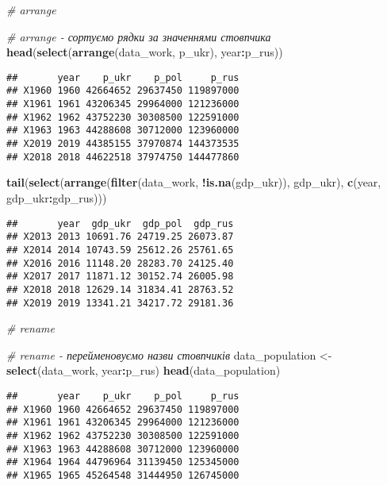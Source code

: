 \documentclass[
]{article}
\newenvironment{Shaded}{\begin{snugshade}}{\end{snugshade}}
\newcommand{\CommentTok}[1]{\textcolor[rgb]{0.56,0.35,0.01}{\textit{#1}}}
\newcommand{\KeywordTok}[1]{\textcolor[rgb]{0.13,0.29,0.53}{\textbf{#1}}}
\newcommand{\NormalTok}[1]{#1}
\newcommand{\OperatorTok}[1]{\textcolor[rgb]{0.81,0.36,0.00}{\textbf{#1}}}
\newcommand{\StringTok}[1]{\textcolor[rgb]{0.31,0.60,0.02}{#1}}
\begin{document}
\begin{Shaded}
\begin{Highlighting}[]
\CommentTok{# arrange}

\CommentTok{# arrange - сортуємо рядки за значеннями стовпчика}
\KeywordTok{head}\NormalTok{(}\KeywordTok{select}\NormalTok{(}\KeywordTok{arrange}\NormalTok{(data_work, p_ukr), year}\OperatorTok{:}\NormalTok{p_rus))}
\end{Highlighting}
\end{Shaded}

\begin{verbatim}
##       year    p_ukr    p_pol     p_rus
## X1960 1960 42664652 29637450 119897000
## X1961 1961 43206345 29964000 121236000
## X1962 1962 43752230 30308500 122591000
## X1963 1963 44288608 30712000 123960000
## X2019 2019 44385155 37970874 144373535
## X2018 2018 44622518 37974750 144477860
\end{verbatim}

\begin{Shaded}
\begin{Highlighting}[]
\KeywordTok{tail}\NormalTok{(}\KeywordTok{select}\NormalTok{(}\KeywordTok{arrange}\NormalTok{(}\KeywordTok{filter}\NormalTok{(data_work, }\OperatorTok{!}\KeywordTok{is.na}\NormalTok{(gdp_ukr)), gdp_ukr), }\KeywordTok{c}\NormalTok{(year, gdp_ukr}\OperatorTok{:}\NormalTok{gdp_rus)))}
\end{Highlighting}
\end{Shaded}

\begin{verbatim}
##       year  gdp_ukr  gdp_pol  gdp_rus
## X2013 2013 10691.76 24719.25 26073.87
## X2014 2014 10743.59 25612.26 25761.65
## X2016 2016 11148.20 28283.70 24125.40
## X2017 2017 11871.12 30152.74 26005.98
## X2018 2018 12629.14 31834.41 28763.52
## X2019 2019 13341.21 34217.72 29181.36
\end{verbatim}

\begin{Shaded}
\begin{Highlighting}[]
\CommentTok{# rename}

\CommentTok{# rename - перейменовуємо назви стовпчиків}
\NormalTok{data_population <-}\StringTok{ }\KeywordTok{select}\NormalTok{(data_work, year}\OperatorTok{:}\NormalTok{p_rus)}
\KeywordTok{head}\NormalTok{(data_population)}
\end{Highlighting}
\end{Shaded}

\begin{verbatim}
##       year    p_ukr    p_pol     p_rus
## X1960 1960 42664652 29637450 119897000
## X1961 1961 43206345 29964000 121236000
## X1962 1962 43752230 30308500 122591000
## X1963 1963 44288608 30712000 123960000
## X1964 1964 44796964 31139450 125345000
## X1965 1965 45264548 31444950 126745000
\end{verbatim}
\end{document}
